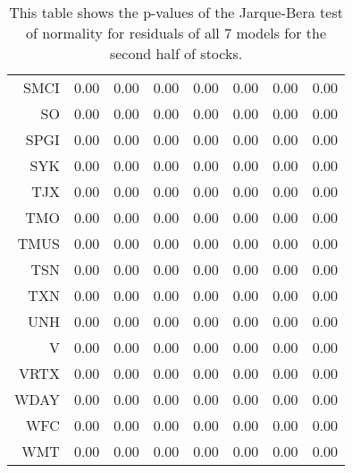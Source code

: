 \begin{table}[ht]
\begin{tabular}{rrrrrrrr}
  SMCI & 0.00 & 0.00 & 0.00 & 0.00 & 0.00 & 0.00 & 0.00 \\ 
  SO & 0.00 & 0.00 & 0.00 & 0.00 & 0.00 & 0.00 & 0.00 \\ 
  SPGI & 0.00 & 0.00 & 0.00 & 0.00 & 0.00 & 0.00 & 0.00 \\ 
  SYK & 0.00 & 0.00 & 0.00 & 0.00 & 0.00 & 0.00 & 0.00 \\ 
  TJX & 0.00 & 0.00 & 0.00 & 0.00 & 0.00 & 0.00 & 0.00 \\ 
  TMO & 0.00 & 0.00 & 0.00 & 0.00 & 0.00 & 0.00 & 0.00 \\ 
  TMUS & 0.00 & 0.00 & 0.00 & 0.00 & 0.00 & 0.00 & 0.00 \\ 
  TSN & 0.00 & 0.00 & 0.00 & 0.00 & 0.00 & 0.00 & 0.00 \\ 
  TXN & 0.00 & 0.00 & 0.00 & 0.00 & 0.00 & 0.00 & 0.00 \\ 
  UNH & 0.00 & 0.00 & 0.00 & 0.00 & 0.00 & 0.00 & 0.00 \\ 
  V & 0.00 & 0.00 & 0.00 & 0.00 & 0.00 & 0.00 & 0.00 \\ 
  VRTX & 0.00 & 0.00 & 0.00 & 0.00 & 0.00 & 0.00 & 0.00 \\ 
  WDAY & 0.00 & 0.00 & 0.00 & 0.00 & 0.00 & 0.00 & 0.00 \\ 
  WFC & 0.00 & 0.00 & 0.00 & 0.00 & 0.00 & 0.00 & 0.00 \\ 
  WMT & 0.00 & 0.00 & 0.00 & 0.00 & 0.00 & 0.00 & 0.00 \\ 
   \hline
\end{tabular}
\caption[p-values of Jarque-Bera test on model residuals (2)]{This table shows the p-values of the Jarque-Bera test of normality for residuals 
              of all 7 models for the second half of stocks.} 
\label{Table:JBresid_p_vals_2}
\end{table}
